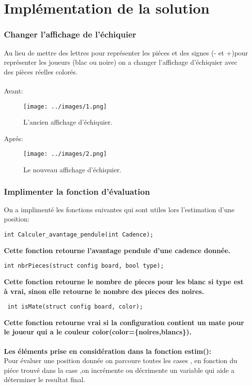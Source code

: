 \documentclass[12pt]{report}
\begin{document}
	\chapter{Implémentation de la solution}
	\subsection{Changer l'affichage de l'échiquier}
Au lieu de mettre des lettres pour représenter les piéces et des signes (- et +)pour représenter les joueurs (blac ou noire) on a changer l'affichage d'échiquier avec des pièces réelles colorés.  \\ \\
	Avant:
		\begin{figure}[h!]
		\centering
		\texttt{[image: ../images/1.png]}
		\caption{L'ancien affichage d'échiquier.}	
	\end{figure}
	\FloatBarrier
	\newpage
	Aprés:
		\begin{figure}[h!]
		\centering
		\texttt{[image: ../images/2.png]}
		\caption{Le nouveau affichage d'échiquier.}	
	\end{figure}
	\FloatBarrier
	\subsection{Implimenter la fonction d'évaluation}
		On a implimenté les fonctions suivantes qui sont utiles lors l'estimation d'une position:
				\lstset{language=C}
				\lstset{basicstyle=\footnotesize}
				\begin{lstlisting}
int Calculer_avantage_pendule(int Cadence);
				\end{lstlisting}
				\textbf{ Cette fonction retourne l'avantage pendule d'une cadence donnée.}
 	     	 \lstset{language=C}
			 \lstset{basicstyle=\footnotesize}
			 \begin{lstlisting}
int nbrPieces(struct config board, bool type);
			 \end{lstlisting}
			 \textbf{Cette fonction retourne le nombre de pieces pour les blanc si type est à vrai, sinon elle retourne le nombre des pieces des noires.} 
			  \lstset{language=C}
			 \lstset{basicstyle=\footnotesize}
			 \begin{lstlisting}
 int isMate(struct config board, color);
			 \end{lstlisting}
			 \textbf{Cette fonction retourne vrai si la configuration contient un mate pour le joueur qui a le couleur color(color=\{noires,blancs\}).} 
\\\\	\textbf{Les éléments prise en considération dans la fonction estim():}
\\Pour évaluer une position donnée on parcoure toutes les cases , en fonction du piéce trouvé dans la case ,on incrémente ou décrimente un variable qui aide a déterminer le resultat final.
 
\end{document}
